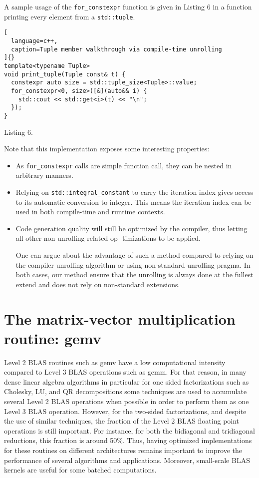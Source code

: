 \documentclass[../main]{subfiles}
\begin{document}
A sample usage of the \lstinline{for_constexpr} function is given
in Listing 6 in a function printing every element from a
\lstinline{std::tuple}.

\begin{lstlisting}[
  language=c++,
  caption=Tuple member walkthrough via compile-time unrolling
]{}
template<typename Tuple>
void print_tuple(Tuple const& t) {
  constexpr auto size = std::tuple_size<Tuple>::value;
  for_constexpr<0, size>([&](auto&& i) {
    std::cout << std::get<i>(t) << "\n";
  });
}
\end{lstlisting}
Listing 6.

Note that this implementation exposes some interesting
properties:

\begin{itemize}
\item As \lstinline{for_constexpr} calls are simple function call, they
can be nested in arbitrary manners.

\item Relying on \lstinline{std::integral_constant} to carry the
iteration index gives access to its automatic conversion
to integer. This means the iteration index can be used in
both compile-time and runtime contexts.

\item Code generation quality will still be optimized by the
compiler, thus letting all other non-unrolling related op-
timizations to be applied.

One can argue about the advantage of such a method
compared to relying on the compiler unrolling algorithm
or using non-standard unrolling pragma. In both cases, our
method ensure that the unrolling is always done at the fullest
extend and does not rely on non-standard extensions.
\end{itemize}

\section{
  The matrix-vector multiplication routine: gemv
}

Level 2 BLAS routines such as gemv have a low
computational intensity compared to Level 3 BLAS operations
such as gemm. For that reason, in many dense linear algebra
algorithms in particular for one sided factorizations such as
Cholesky, LU, and QR decompositions some techniques are
used to accumulate several Level 2 BLAS operations when
possible in order to perform them as one Level 3 BLAS
operation\cite{hpcs18}. However, for the two-sided factorizations,
and despite the use of similar techniques, the fraction of the
Level 2 BLAS floating point operations is still important. For
instance, for both the bidiagonal and tridiagonal reductions,
this fraction is around 50\%\cite{hpcs19}. Thus, having optimized
implementations for these routines on different architectures
remains important to improve the performance of several
algorithms and applications. Moreover, small-scale BLAS
kernels are useful for some batched computations\cite{hpcs20}.
\end{document}

